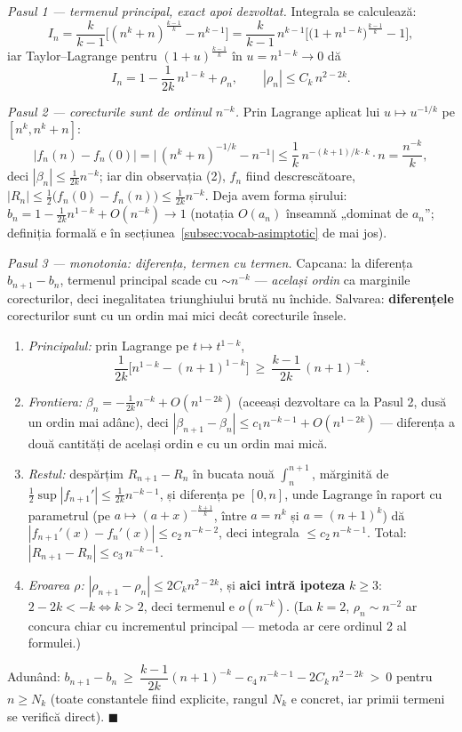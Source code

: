 \emph{Pasul 1 --- termenul principal, exact apoi dezvoltat.} Integrala se calculează:
\[
I_n=\frac{k}{k-1}\Big[(n^k+n)^{\frac{k-1}{k}}-n^{k-1}\Big]
=\frac{k}{k-1}\,n^{k-1}\Big[\big(1+n^{1-k}\big)^{\frac{k-1}{k}}-1\Big],
\]
iar Taylor--Lagrange pentru $(1+u)^{\frac{k-1}{k}}$ în $u=n^{1-k}\to0$ dă
\[
I_n=1-\frac{1}{2k}\,n^{1-k}+\rho_n,\qquad |\rho_n|\le C_k\,n^{2-2k}.
\]

\emph{Pasul 2 --- corecturile sunt de ordinul $n^{-k}$.} Prin Lagrange aplicat lui $u\mapsto u^{-1/k}$ pe $[n^k,n^k+n]$:
\[
|f_n(n)-f_n(0)|=\Big|\,(n^k+n)^{-1/k}-n^{-1}\Big|\le\frac1k\,n^{-(k+1)/k\cdot k}\cdot n=\frac{n^{-k}}{k},
\]
deci $|\beta_n|\le\frac{1}{2k}n^{-k}$; iar din observația (2), $f_n$ fiind descrescătoare, $|R_n|\le\frac12\big(f_n(0)-f_n(n)\big)\le\frac{1}{2k}n^{-k}$. Deja avem forma șirului: $b_n=1-\frac{1}{2k}n^{1-k}+O(n^{-k})\to1$ (notația $O(a_n)$ înseamnă „dominat de $a_n$''; definiția formală e în secțiunea~\ref{subsec:vocab-asimptotic} de mai jos).

\emph{Pasul 3 --- monotonia: diferența, termen cu termen.} Capcana: la diferența $b_{n+1}-b_n$, termenul principal scade cu $\sim n^{-k}$ --- \emph{același ordin} ca marginile corecturilor, deci inegalitatea triunghiului brută nu închide. Salvarea: \textbf{diferențele} corecturilor sunt cu un ordin mai mici decât corecturile însele.
\begin{enumerate}[leftmargin=*, itemsep=2pt]
\item \emph{Principalul:} prin Lagrange pe $t\mapsto t^{1-k}$,
\[
\frac{1}{2k}\Big[n^{1-k}-(n+1)^{1-k}\Big]\ \ge\ \frac{k-1}{2k}\,(n+1)^{-k}.
\]
\item \emph{Frontiera:} $\beta_n=-\frac{1}{2k}n^{-k}+O(n^{1-2k})$ (aceeași dezvoltare ca la Pasul 2, dusă un ordin mai adânc), deci $|\beta_{n+1}-\beta_n|\le c_1n^{-k-1}+O(n^{1-2k})$ --- diferența a două cantități de același ordin e cu un ordin mai mică.
\item \emph{Restul:} despărțim $R_{n+1}-R_n$ în bucata nouă $\int_n^{n+1}$, mărginită de $\frac12\sup|f_{n+1}'|\le\frac{1}{2k}n^{-k-1}$, și diferența pe $[0,n]$, unde Lagrange în raport cu parametrul (pe $a\mapsto(a+x)^{-\frac{k+1}{k}}$, între $a=n^k$ și $a=(n+1)^k$) dă $|f_{n+1}'(x)-f_n'(x)|\le c_2\,n^{-k-2}$, deci integrala $\le c_2\,n^{-k-1}$. Total: $|R_{n+1}-R_n|\le c_3\,n^{-k-1}$.
\item \emph{Eroarea $\rho$:} $|\rho_{n+1}-\rho_n|\le2C_kn^{2-2k}$, și \textbf{aici intră ipoteza} $k\ge3$: $2-2k<-k\iff k>2$, deci termenul e $o(n^{-k})$. (La $k=2$, $\rho_n\sim n^{-2}$ ar concura chiar cu incrementul principal --- metoda ar cere ordinul 2 al formulei.)
\end{enumerate}
Adunând: $b_{n+1}-b_n\ \ge\ \dfrac{k-1}{2k}(n+1)^{-k}-c_4\,n^{-k-1}-2C_k\,n^{2-2k}\ >\ 0$ pentru $n\ge N_k$ (toate constantele fiind explicite, rangul $N_k$ e concret, iar primii termeni se verifică direct). $\blacksquare$

